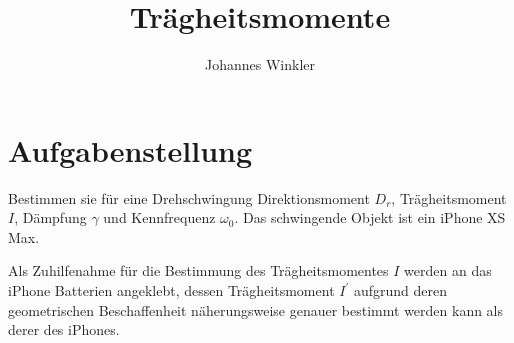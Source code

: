 \documentclass{article}
\title{Trägheitsmomente}
\author{Johannes Winkler}
\date{}
\begin{document}
 
 
 
\pagestyle{fancy}


\tableofcontents

\newpage




\section{Aufgabenstellung}
Bestimmen sie für eine Drehschwingung Direktionsmoment $D_r$, Trägheitsmoment $I$, Dämpfung $\gamma$ und Kennfrequenz $\omega_0$. Das schwingende Objekt ist ein iPhone XS Max. 

Als Zuhilfenahme für die Bestimmung des Trägheitsmomentes $I$ werden an das iPhone Batterien angeklebt, dessen Trägheitsmoment $I^\prime$ aufgrund deren geometrischen Beschaffenheit näherungsweise genauer bestimmt werden kann als derer des iPhones.
\end{document}
